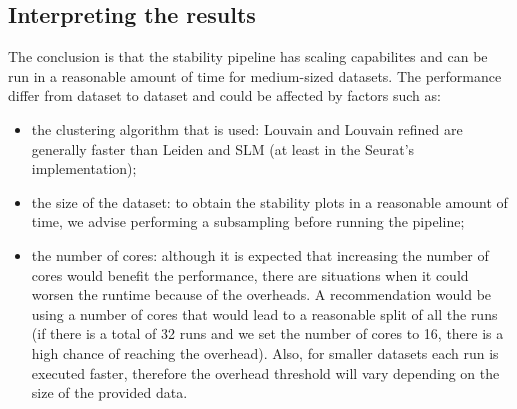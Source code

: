 \begin{figure}[H]
\end{figure}

\subsection{Interpreting the results}
The conclusion is that the stability pipeline has scaling capabilites and can be run in a reasonable amount of time for medium-sized datasets. The performance differ from dataset to dataset and could be affected by factors such as:
\begin{itemize}
    \item the clustering algorithm that is used: Louvain and Louvain refined are generally faster than Leiden and SLM (at least in the Seurat's implementation);
    \item the size of the dataset: to obtain the stability plots in a reasonable amount of time, we advise performing a subsampling before running the pipeline;
    \item the number of cores: although it is expected that increasing the number of cores would benefit the performance, there are situations when it could worsen the runtime because of the overheads. A recommendation would be using a number of cores that would lead to a reasonable split of all the runs (if there is a total of 32 runs and we set the number of cores to 16, there is a high chance of reaching the overhead). Also, for smaller datasets each run is executed faster, therefore the overhead threshold will vary depending on the size of the provided data.
\end{itemize}